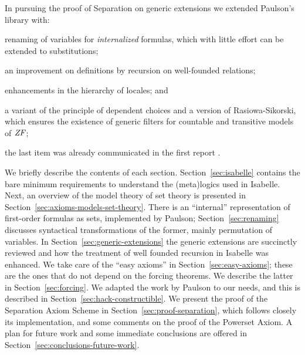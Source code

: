 
In pursuing the proof of Separation on generic extensions we
extended Paulson's library with:
\begin{inlinelist}
\item renaming of variables for \emph{internalized} formulas, which
  with little effort can be extended 
  to substitutions;
\item an improvement on definitions by recursion on well-founded
  relations; 
\item enhancements in the hierarchy of locales; and
\item a variant of the  principle of dependent choices and a version
  of Rasiowa-Sikorski, which 
  ensures the existence of generic filters for countable and transitive
  models of $\mathit{ZF}$;
\end{inlinelist} 
the last item was already communicated in the
  first report \cite{2018arXiv180705174G}.
  
We briefly describe the contents of each
section. Section~\ref{sec:isabelle} contains the bare minimum
requirements to understand the (meta)logics used in Isabelle. Next, an
overview of the model theory of set theory is presented in
Section~\ref{sec:axioms-models-set-theory}. There is an ``internal''
representation of first-order formulas as sets, implemented by
Paulson; Section~\ref{sec:renaming} discusses syntactical
transformations of the former, mainly permutation of variables. 
In Section~\ref{sec:generic-extensions} the generic extensions are
succinctly reviewed and how the treatment of well founded recursion in
Isabelle was enhanced. We take care of the ``easy axioms'' in
Section~\ref{sec:easy-axioms}; these are the ones that
do not depend on the forcing theorems. We describe the latter in
Section~\ref{sec:forcing}. We adapted the  work by Paulson to our
needs, and this is described in
Section~\ref{sec:hack-constructible}. We present the proof
of the Separation Axiom Scheme in Section~\ref{sec:proof-separation},
which follows closely its implementation, and some comments on the
proof of the Powerset Axiom. A plan for future work and
some immediate conclusions are offered in
Section~\ref{sec:conclusions-future-work}.

